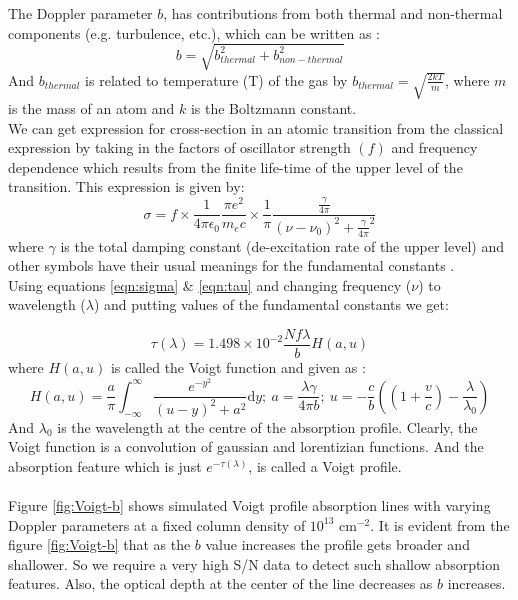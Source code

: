 The Doppler parameter $b$, has contributions from both thermal and non-thermal components (e.g. turbulence, etc.), which can be written as :
\begin{equation}
b=\sqrt{{b_{thermal}^2+b_{non-thermal}^2}}
\end{equation}
And $b_{thermal}$ is related to temperature (T) of the gas by $b_{thermal}=\sqrt{\frac{2kT}{m}}$, where $m$ is the mass of an atom and $k$ is the Boltzmann constant.
\\
We can get expression for cross-section in an atomic transition from the classical expression by taking in the factors of oscillator strength $(f)$ and frequency dependence which results from the finite life-time of the upper level of the transition. This expression is given by:
\begin{equation} \label{eqn:sigma}
\sigma=f \times \frac{1}{4\pi\epsilon_0} \frac{\pi e^2}{m_ec} \times \frac{1}{\pi} \frac{\frac{\gamma}{4\pi}}{{(\nu-\nu_0)}^2+{\frac{\gamma}{4\pi}}^2}
\end{equation}
where $\gamma$ is the total damping constant (de-excitation rate of the upper level) and other symbols have their usual meanings for the fundamental constants \citep{Voigt-eqn}. 
\\
Using equations \ref{eqn:sigma} \& \ref{eqn:tau} and changing frequency ($\nu$) to wavelength ($\lambda$) and putting values of the fundamental constants we get:

\begin{equation} \label{eqn:tau-lambda}
\tau(\lambda)=1.498 \times 10^{-2} \frac{Nf\lambda}{b} H(a,u)    
\end{equation}
where $H(a,u)$ is called the Voigt function and given as :
\begin{equation} \label{eqn:Voigt-func}
    H(a,u)=\frac{a}{\pi} \int_{-\infty}^{\infty} \frac{e^{-y^2}}{{(u-y)}^2+a^2} \text{d}y; \ a=\frac{\lambda \gamma}{4\pi b}; \ u=-\frac{c}{b}\left((1+\frac{v}{c})-\frac{\lambda}{\lambda_0}\right) 
\end{equation}
And $\lambda_0$ is the wavelength at the centre of the absorption profile. Clearly, the Voigt function is a convolution of gaussian and lorentizian functions. And the absorption feature which is just $e^{-\tau(\lambda)}$, is called a Voigt profile.
\\\\
Figure \ref{fig:Voigt-b} shows simulated Voigt profile absorption lines with varying Doppler parameters at a fixed column density of $10^{13}$ cm$^{-2}$. It is evident from the figure \ref{fig:Voigt-b} that as the $b$ value increases the profile gets broader and shallower. So we require a very high S/N data to detect such shallow absorption features. Also, the optical depth at the center of the line decreases as $b$ increases. 

